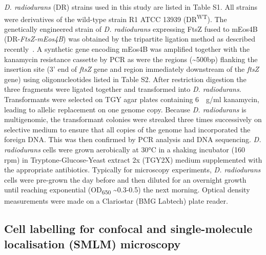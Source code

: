 \textit{D. radiodurans} (DR) strains used in this study are listed in Table S1.
All strains were derivatives of the wild-type strain R1 ATCC 13939 (DR\textsuperscript{WT}).
The genetically engineered strain of \textit{D. radiodurans} expressing FtsZ fused to mEos4B (DR-\textit{FtsZ-mEos4B}) was obtained by the tripartite ligation method as described recently~\cite{vauclareStressinducedNucleoidRemodeling2024}.
A synthetic gene encoding mEos4B was amplified together with the kanamycin resistance cassette by PCR as were the regions (\sim500bp) flanking the insertion site (3' end of \textit{ftsZ} gene and region immediately downstream of the \textit{ftsZ} gene) using oligonucleotides listed in Table S2.
After restriction digestion the three fragments were ligated together and transformed into \textit{D. radiodurans}.
Transformants were selected on TGY agar plates containing \qty{6}{\mu{}g/ml} kanamycin, leading to allelic replacement on one genome copy.
Because \textit{D. radiodurans} is multigenomic, the transformant colonies were streaked three times successively on selective medium to ensure that all copies of the genome had incorporated the foreign DNA.
This was then confirmed by PCR analysis and DNA sequencing.
\textit{D. radiodurans} cells were grown aerobically at \ang{30}C in a shaking incubator (160 rpm) in Tryptone-Glucose-Yeast extract 2x (TGY2X) medium supplemented with the appropriate antibiotics.
Typically for microscopy experiments, \textit{D. radiodurans} cells were pre-grown the day before and then diluted for an overnight growth until reaching exponential (OD\textsubscript{650} \sim0.3-0.5) the next morning.
Optical density measurements were made on a Clariostar (BMG Labtech) plate reader.

\subsection{Cell labelling for confocal and single-molecule localisation (SMLM) microscopy}

